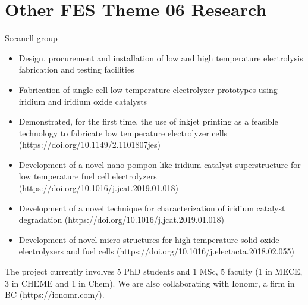 \documentclass{beamer}
\renewcommand{\(}{\begin{columns}}
\renewcommand{\)}{\end{columns}}
\newcommand{\<}[1]{\begin{column}{#1}}
\renewcommand{\>}{\end{column}}
\begin{document}
\section{Other FES Theme 06 Research}
\begin{frame} Secanell group
\begin{block}{}
\footnotesize{\begin{itemize}
  \item Design, procurement and installation of low and high temperature electrolysis fabrication and testing facilities
  \item Fabrication of single-cell low temperature electrolyzer prototypes using iridium and iridium oxide catalysts
  \item Demonstrated, for the first time, the use of inkjet printing as a feasible technology to fabricate low temperature electrolyzer cells  (https://doi.org/10.1149/2.1101807jes)
   \item Development of a novel nano-pompon-like iridium catalyst superstructure for low temperature fuel cell electrolyzers (https://doi.org/10.1016/j.jcat.2019.01.018)
   \item Development of a novel technique for characterization of iridium catalyst degradation (https://doi.org/10.1016/j.jcat.2019.01.018)
 \item Development of novel micro-structures for high temperature solid oxide electrolyzers and fuel cells (https://doi.org/10.1016/j.electacta.2018.02.055)
  \end{itemize}}
The project currently involves 5 PhD students and 1 MSc, 5 faculty (1 in MECE, 3 in CHEME and 1 in Chem). We are also collaborating with Ionomr, a firm in BC (https://ionomr.com/).
  \end{block}
   \vfill
\end{frame}
\end{document}
